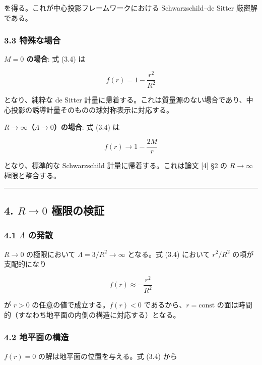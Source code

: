 \documentclass[a4paper,11pt]{ltjsarticle}
\theoremstyle{definition}
\begin{document}
を得る。これが中心投影フレームワークにおける Schwarzschild--de Sitter
厳密解である。

\subsubsection{3.3 特殊な場合}\label{ux7279ux6b8aux306aux5834ux5408}

\textbf{\(M = 0\) の場合}: 式 (3.4) は

\[f(r) = 1 - \frac{r^2}{R^2} \tag{3.5}\]

となり、純粋な de Sitter
計量に帰着する。これは質量源のない場合であり、中心投影の誘導計量そのものの球対称表示に対応する。

\textbf{\(R \to \infty\)（\(\Lambda \to 0\)）の場合}: 式 (3.4) は

\[f(r) \to 1 - \frac{2M}{r} \tag{3.6}\]

となり、標準的な Schwarzschild 計量に帰着する。これは論文 {[}4{]} §2 の
\(R \to \infty\) 極限と整合する。

\begin{center}\rule{0.5\linewidth}{0.5pt}\end{center}

\subsection{\texorpdfstring{4. \(R \to 0\)
極限の検証}{4. R \textbackslash to 0 極限の検証}}\label{r-to-0-ux6975ux9650ux306eux691cux8a3c}

\subsubsection{\texorpdfstring{4.1 \(\Lambda\)
の発散}{4.1 \textbackslash Lambda の発散}}\label{lambda-ux306eux767aux6563}

\(R \to 0\) の極限において \(\Lambda = 3/R^2 \to \infty\) となる。式
(3.4) において \(r^2/R^2\) の項が支配的になり

\[f(r) \approx -\frac{r^2}{R^2} \tag{4.1}\]

が \(r > 0\) の任意の値で成立する。\(f(r) < 0\)
であるから、\(r = \text{const}\)
の面は時間的（すなわち地平面の内側の構造に対応する）となる。

\subsubsection{4.2
地平面の構造}\label{ux5730ux5e73ux9762ux306eux69cbux9020}

\(f(r) = 0\) の解は地平面の位置を与える。式 (3.4) から
\end{document}
